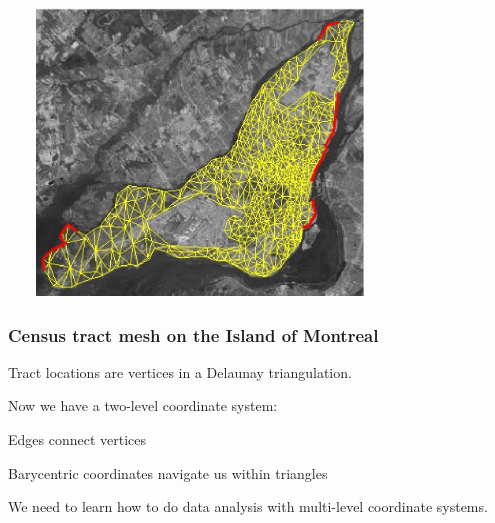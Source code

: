 \documentclass[11pt]{beamer}
\begin{document}

\begin{frame}

\begin{center}
\includegraphics[height=3in, width=4in]{figs/fig_Montreal_triangulation_dirichlet_small.eps}
\end{center}

\end{frame}


\begin{frame}

\frametitle{Census tract mesh on the Island of Montreal}

\bi
  \item Tract locations are vertices in a Delaunay triangulation.
  \item Now we have a two-level coordinate system:
  \bi
    \item Edges connect vertices
    \item Barycentric coordinates navigate us within triangles
  \ei
  \item We need to learn how to do data analysis with multi-level coordinate systems.
\ei

\end{frame}

\end{document}
